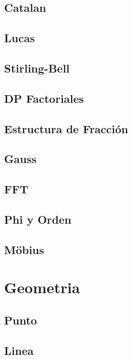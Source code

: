\documentclass[a4paper,10pt,twocolumn]{article}
\begin{document}
\subsection{Catalan}

\subsection{Lucas}

\subsection{Stirling-Bell}

\subsection{DP Factoriales}

\subsection{Estructura de Fracción}

\subsection{Gauss}

\subsection{FFT}

\subsection{Phi y Orden}

\subsection{Möbius}


\section{Geometria} %
\subsection{Punto}

\subsection{Linea}

\end{document}
